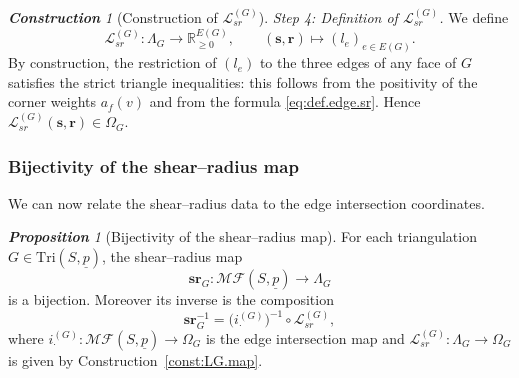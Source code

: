 \documentclass[11pt, letterpaper]{amsart}
\theoremstyle{definition}
\theoremstyle{remark}
\newtheorem{proposition}[theorem]{\rm\bf Proposition}
\newtheorem{construction}[theorem]{\rm\bf Construction}
\newcommand{\up}{\underline{p}}
\newcommand{\Sp}{(S,\up)}
\newcommand{\TSp}{\text{Tri}\Sp}
\newcommand{\cMFp}{\mathcal{MF} (S,\up)}
\newcommand{\bR}{\mathbb{R}}
\numberwithin{equation}{section}
\begin{document}
\begin{construction}[Construction of \(\mathcal{L}^{(G)}_{sr}\)]
\medskip\noindent
\emph{Step 4: Definition of \(\mathcal{L}^{(G)}_{sr}\).}
We define
\[
\mathcal{L}^{(G)}_{sr} : \Lambda_G \longrightarrow \bR_{\ge0}^{E(G)}, \qquad
(\mathbf{s},\mathbf{r}) \longmapsto (l_e)_{e\in E(G)}.
\]
By construction, the restriction of \((l_e)\) to the three edges of any face of \(G\) satisfies the strict triangle inequalities: this follows from the positivity of the corner weights \(a_f(v)\) and from the formula \eqref{eq:def.edge.sr}.
Hence \(\mathcal{L}^{(G)}_{sr}(\mathbf{s},\mathbf{r})\in\Omega_G\).
\end{construction}

\subsubsection{Bijectivity of the shear--radius map}

We can now relate the shear--radius data to the edge intersection coordinates.

\begin{proposition}[Bijectivity of the shear--radius map]
\label{prop:bijection.srG}
For each triangulation \(G\in\TSp\), the shear--radius map
\[
\mathbf{sr}_G : \cMFp \longrightarrow \Lambda_G
\]
is a bijection.
Moreover its inverse is the composition
\[
\mathbf{sr}_G^{-1} = \bigl(i^{(G)}_{\cdot}\bigr)^{-1} \circ \mathcal{L}^{(G)}_{sr},
\]
where \(i^{(G)}_{\cdot}:\cMFp\to\Omega_G\) is the edge intersection map and \(\mathcal{L}^{(G)}_{sr}:\Lambda_G\to\Omega_G\) is given by Construction~\ref{const:LG.map}.
\end{proposition}
\end{document}
